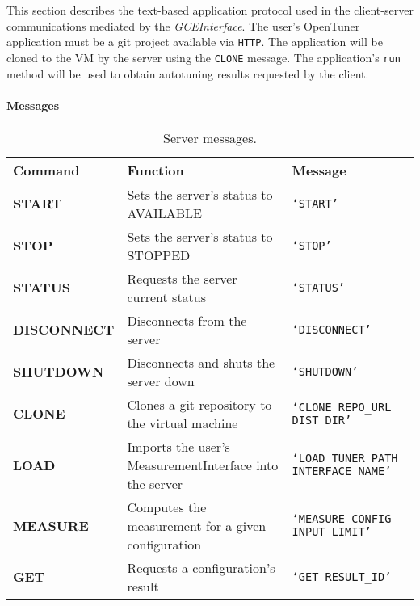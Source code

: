 This section describes the text-based application protocol used in the
client-server communications mediated by the \emph{GCEInterface}. The user's
OpenTuner application must be a git project available via
\texttt{\footnotesize{HTTP}}. The application will be cloned to the VM by the server using the \texttt{\footnotesize CLONE} message.  The
application's \texttt{\footnotesize run} method will be used to obtain
autotuning results requested by the client.

\paragraph{Messages}
\begin{table}[htpb]
    \centering
    \scriptsize
    \begin{tabular}{@{}p{1.95cm}p{3cm}p{4.5cm}@{}}
        \toprule
        {\bf Command} & {\bf Function} & {\bf Message} \\ \midrule
        {\scriptsize \bf START} &
        {\scriptsize Sets the server's status to AVAILABLE} &
        {\scriptsize \tt \lq{}START\rq{}} \\ \midrule
        {\scriptsize \bf STOP} &
        {\scriptsize Sets the server's status to STOPPED} &
        {\scriptsize \tt \lq{}STOP\rq{}} \\ \midrule
        {\scriptsize \bf STATUS} &
        {\scriptsize Requests the server current status} &
        {\scriptsize \tt \lq{}STATUS\rq{}} \\ \midrule
        {\scriptsize \bf DISCONNECT} &
        {\scriptsize Disconnects from the server} &
        {\scriptsize \tt \lq{}DISCONNECT\rq{}} \\ \midrule
        {\scriptsize \bf SHUTDOWN} &
        {\scriptsize Disconnects and shuts the server down} &
        {\scriptsize \tt \lq{}SHUTDOWN\rq{}} \\ \midrule
        {\scriptsize \bf CLONE} &
        {\scriptsize Clones a git repository to the virtual machine} &
        {\scriptsize \tt \lq{}CLONE REPO\_URL DIST\_DIR\rq{}} \\ \midrule
        {\scriptsize \bf LOAD} &
        {\scriptsize Imports the user's MeasurementInterface into the server} &
        {\scriptsize \tt \lq{}LOAD TUNER\_PATH INTERFACE\_NAME\rq{}} \\ \midrule
        {\scriptsize \bf MEASURE} &
        {\scriptsize Computes the measurement for a given configuration} &
        {\scriptsize \tt \lq{}MEASURE CONFIG INPUT LIMIT\rq{}} \\ \midrule
        {\scriptsize \bf GET} &
        {\scriptsize Requests a configuration's result} &
        {\scriptsize \tt \lq{}GET RESULT\_ID\rq{}} \\ \bottomrule
    \end{tabular}
    \caption{Server messages.}
    \label{tab:protocol-messages}
\end{table}

